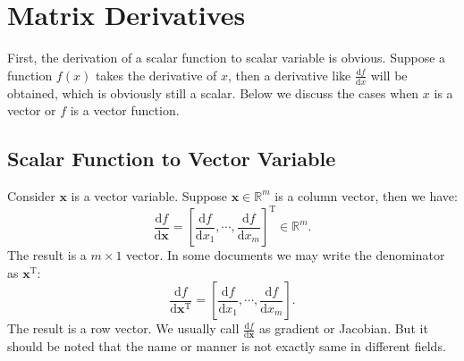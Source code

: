 \chapter{Matrix Derivatives}
First, the derivation of a scalar function to scalar variable is obvious. Suppose a function $f(x)$ takes the derivative of $x$, then a derivative like $\frac{\mathrm{d}f}{\mathrm{d}x}$ will be obtained, which is obviously still a scalar. Below we discuss the cases when $x$ is a vector or $f$ is a vector function.

\section{Scalar Function to Vector Variable}
Consider $\bm{x}$ is a vector variable. Suppose $\bm{x} \in \mathbb{R}^m$ is a column vector, then we have:
\begin{equation}
	\frac{{\mathrm{d}f}}{{\mathrm{d}\bm{x}}} = {\left[ {\frac{{\mathrm{d}f}}{{\mathrm{d}{x_1}}}, \cdots ,\frac{{\mathrm{d}f}}{{\mathrm{d}{x_m}}}} \right]^\mathrm{T}} \in {\mathbb{R}^m}.
\end{equation}
The result is a $m \times 1$ vector. In some documents we may write the denominator as $\bm{x}^\mathrm{T}$:
\begin{equation}
	\frac{{\mathrm{d}f}}{{\mathrm{d}\bm{x}^\mathrm{T}}} =  {\left[ {\frac{{\mathrm{d}f}}{{\mathrm{d}{x_1}}}, \cdots ,\frac{{\mathrm{d}f}}{{\mathrm{d}{x_m}}}} \right]}.
\end{equation}
The result is a row vector. We usually call $\frac{\mathrm{d}f}{\mathrm{d}\bm{x}}$ as gradient or Jacobian. But it should be noted that the name or manner is not exactly same in different fields.

